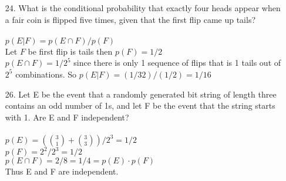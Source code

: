 \begin{itemize}
    \item[24.] What is the conditional probability that exactly four heads
          appear when a fair coin is flipped five times, given that
          the first flip came up tails? \\
          \answer \\
          $p(E | F) = p(E \cap F) / p(F)$\\
          Let $F$ be first flip is tails then $p(F) = 1/2$ \\
          $p(E \cap F) = 1/2^5$ since there is only 1 sequence of flips that is 1 tails
          out of $2^5$ combinations. So $p(E|F) = (1/32)/(1/2)= 1/16$

    \item[26.]  Let E be the event that a randomly generated bit string
          of length three contains an odd number of 1s, and let F
          be the event that the string starts with 1. Are E and F
          independent? \\
          \answer \\
          $p(E) = \left({3 \choose 1} + {3 \choose 3}\right) /2^3 = 1/2$ \\
          $p(F) = 2^2/2^3 = 1/2$ \\
          $p(E \cap F) = 2/8 = 1/4 = p(E) \cdot p(F)$ \\
          Thus E and F are independent.
\end{itemize}